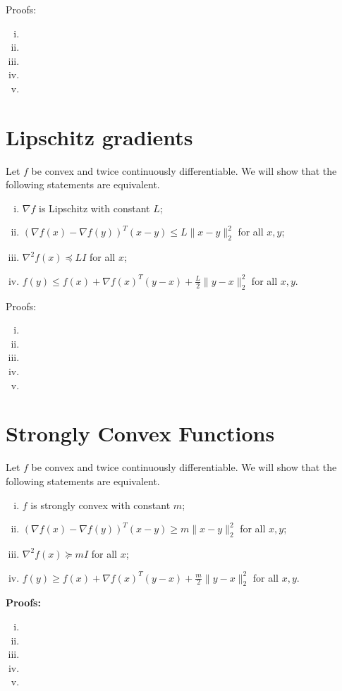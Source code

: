 \documentclass{article}
\theoremstyle{remark}
\theoremstyle{definition}
\begin{document}
\begin{tcolorbox}
Proofs:\\
\begin{enumerate}[i.]
\item 
\item 
\item 
\item 
\item 
\end{enumerate}
\end{tcolorbox}


\section{Lipschitz gradients}


\bigskip
\noindent
Let $f$ be convex and twice continuously differentiable. We will show that the following statements are equivalent.
\begin{enumerate}[i.]
\item $\nabla f$ is Lipschitz with constant $L$;
\item $(\nabla f(x) - \nabla f(y))^T(x-y) \leq L \|x-y\|_2^2$ for all
  $x,y$; 
\item $\nabla^2 f(x) \preceq LI$ for all $x$;
\item $f(y) \leq f(x) + \nabla f(x)^T (y-x) + \frac{L}{2} \|y-x\|_2^2$
  for all $x,y$.
\end{enumerate}


\begin{tcolorbox}
Proofs:\\
\begin{enumerate}[i.]
\item 
\item 
\item 
\item 
\item 
\end{enumerate}
\end{tcolorbox}


\section{Strongly Convex Functions}
\bigskip
\noindent

Let $f$ be convex and twice continuously differentiable. We will show that the following statements are equivalent.
\begin{enumerate}[i.]
\item $f$ is strongly convex with constant $m$;
\item $(\nabla f(x) - \nabla f(y))^T(x-y) \geq m \|x-y\|_2^2$ for all
  $x,y$;
\item $\nabla^2 f(x) \succeq mI$ for all $x$;
\item $f(y) \geq f(x) + \nabla f(x)^T (y-x) + \frac{m}{2}
  \|y-x\|_2^2$ for all $x,y$.
\end{enumerate}

\begin{tcolorbox}
\textbf{Proofs:} 
\begin{enumerate}[i.]
\item 
\item 
\item 
\item 
\item 
\end{enumerate}
\end{tcolorbox}
\end{document}
